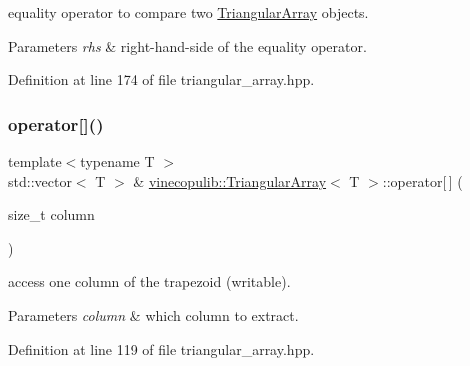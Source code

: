equality operator to compare two \hyperlink{classvinecopulib_1_1_triangular_array}{Triangular\+Array} objects. 


\begin{DoxyParams}{Parameters}
{\em rhs} & right-\/hand-\/side of the equality operator. \\
\hline
\end{DoxyParams}


Definition at line 174 of file triangular\+\_\+array.\+hpp.

\mbox{\label{classvinecopulib_1_1_triangular_array_a30cdac9d2e0e13bce3c6c054283b6fb7}} 
\subsubsection{\texorpdfstring{operator[]()}{operator[]()}\hspace{0.1cm}{\footnotesize\ttfamily [1/2]}}
{\footnotesize\ttfamily template$<$typename T $>$ \\
std\+::vector$<$ T $>$ \& \hyperlink{classvinecopulib_1_1_triangular_array}{vinecopulib\+::\+Triangular\+Array}$<$ T $>$\+::operator\mbox{[}$\,$\mbox{]} (\begin{DoxyParamCaption}\item[{size\+\_\+t}]{column }\end{DoxyParamCaption})}



access one column of the trapezoid (writable). 


\begin{DoxyParams}{Parameters}
{\em column} & which column to extract. \\
\hline
\end{DoxyParams}


Definition at line 119 of file triangular\+\_\+array.\+hpp.

\mbox{\label{classvinecopulib_1_1_triangular_array_a3e6654bb40de5c4b615ea37a8ffecac1}} 
